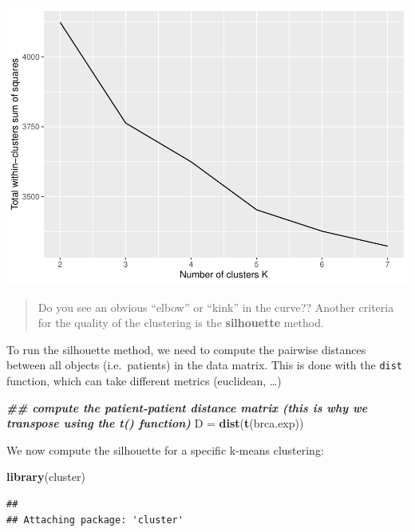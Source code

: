 \documentclass[
]{book}
\newenvironment{Shaded}{\begin{snugshade}}{\end{snugshade}}
\newcommand{\DocumentationTok}[1]{\textcolor[rgb]{0.56,0.35,0.01}{\textbf{\textit{#1}}}}
\newcommand{\FunctionTok}[1]{\textcolor[rgb]{0.13,0.29,0.53}{\textbf{#1}}}
\newcommand{\NormalTok}[1]{#1}
\newcommand{\OtherTok}[1]{\textcolor[rgb]{0.56,0.35,0.01}{#1}}
\begin{document}
\includegraphics{_main_files/figure-latex/unnamed-chunk-72-1.pdf}

\begin{quote}
Do you see an obvious ``elbow'' or ``kink'' in the curve?? Another criteria for the quality of the clustering is the \textbf{silhouette} method.
\end{quote}

To run the silhouette method, we need to compute the pairwise distances between all objects (i.e.~patients) in the data matrix. This is done with the \texttt{dist} function, which can take different metrics (euclidean, \ldots)

\begin{Shaded}
\begin{Highlighting}[]
\DocumentationTok{\#\# compute the patient{-}patient distance matrix (this is why we transpose using the \textasciigrave{}t()\textasciigrave{} function)}
\NormalTok{D }\OtherTok{=} \FunctionTok{dist}\NormalTok{(}\FunctionTok{t}\NormalTok{(brca.exp))}
\end{Highlighting}
\end{Shaded}

We now compute the silhouette for a specific k-means clustering:

\begin{Shaded}
\begin{Highlighting}[]
\FunctionTok{library}\NormalTok{(cluster)}
\end{Highlighting}
\end{Shaded}

\begin{verbatim}
## 
## Attaching package: 'cluster'
\end{verbatim}
\end{document}
